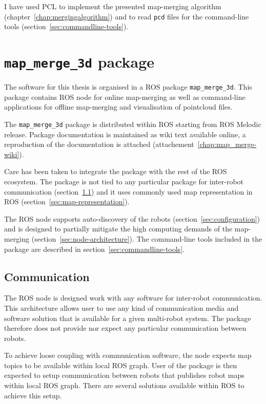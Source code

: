 I have used \gls{PCL} to implement the presented map-merging algorithm (chapter~\ref{chap:mergingalgorithm}) and to read \texttt{pcd} files for the command-line tools (section~\ref{sec:commandline-tools}).

\section{\texttt{map\_merge\_3d} package}

The software for this thesis is organised in a \gls{ROS} package \texttt{map\_merge\_3d}. This package contains \gls{ROS} node for online map-merging as well as command-line applications for offline map-merging and visualisation of pointcloud files.

The \texttt{map\_merge\_3d} package is distributed within \gls{ROS} starting from \gls{ROS} Melodic release. Package documentation is maintained as wiki text available online, a reproduction of the documentation is attached (attachement~\ref{chap:map_merge-wiki}).

Care has been taken to integrate the package with the rest of the \gls{ROS} ecosystem. The package is not tied to any particular package for inter-robot communication (section~\ref{sec:communication}) and it uses commonly used map representation in \gls{ROS} (section~\ref{sec:map-representation}).

The \gls{ROS} node supports auto-discovery of the robots (section~\ref{sec:configuration}) and is designed to partially mitigate the high computing demands of the map-merging (section~\ref{sec:node-architecture}). The command-line tools included in the package are described in section~\ref{sec:commandline-tools}.

\subsection{Communication}
\label{sec:communication}

The \gls{ROS} node is designed work with any software for inter-robot communication. This architecture allows user to use any kind of communication media and software solution that is available for a given multi-robot system. The package therefore does not provide nor expect any particular communication between robots.

To achieve loose coupling with communication software, the node expects map topics to be available within local \gls{ROS} graph. User of the package is then expected to setup communication between robots that publishes robot maps within local \gls{ROS} graph. There are several solutions available within \gls{ROS} to achieve this setup.

